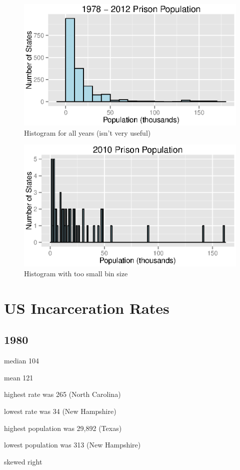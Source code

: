 \documentclass{exam}
\begin{document}
  \begin{figure}[H]
    \centering
    \includegraphics[scale = 0.9]{figures/population_histogram_all_years.eps}
    \caption{Histogram for all years (isn't very useful)}
  \end{figure}

  \begin{figure}[H]
    \centering
    \includegraphics[scale = 0.9]{figures/population_histogram_2010_small_bins.eps}
    \caption{Histogram with too small bin size}
  \end{figure}

  \section{US Incarceration Rates}

  \subsection{1980}

  \begin{itemize*}
    \item median 104
    \item mean 121
    \item highest rate was 265 (North Carolina)
    \item lowest rate was 34 (New Hampshire)
    \item highest population was 29,892 (Texas)
    \item lowest population was 313 (New Hampshire)
    \item skewed right
  \end{itemize*}
\end{document}
